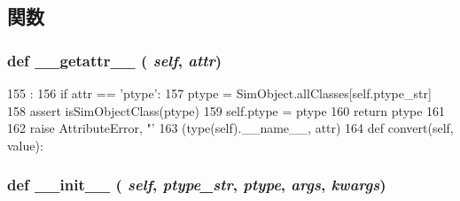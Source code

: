 \subsection{関数}
\hypertarget{classm5_1_1params_1_1ParamDesc_a0a990b3ec3889d40889daca9ee5e4695}{
\subsubsection[{\_\-\_\-getattr\_\-\_\-}]{\setlength{\rightskip}{0pt plus 5cm}def \_\-\_\-getattr\_\-\_\- ( {\em self}, \/   {\em attr})}}
\label{classm5_1_1params_1_1ParamDesc_a0a990b3ec3889d40889daca9ee5e4695}



\begin{DoxyCode}
155                                :
156         if attr == 'ptype':
157             ptype = SimObject.allClasses[self.ptype_str]
158             assert isSimObjectClass(ptype)
159             self.ptype = ptype
160             return ptype
161 
162         raise AttributeError, "'%
163               (type(self).__name__, attr)
164 
    def convert(self, value):
\end{DoxyCode}
\hypertarget{classm5_1_1params_1_1ParamDesc_ac775ee34451fdfa742b318538164070e}{
\subsubsection[{\_\-\_\-init\_\-\_\-}]{\setlength{\rightskip}{0pt plus 5cm}def \_\-\_\-init\_\-\_\- ( {\em self}, \/   {\em ptype\_\-str}, \/   {\em ptype}, \/   {\em args}, \/   {\em kwargs})}}
\label{classm5_1_1params_1_1ParamDesc_ac775ee34451fdfa742b318538164070e}



